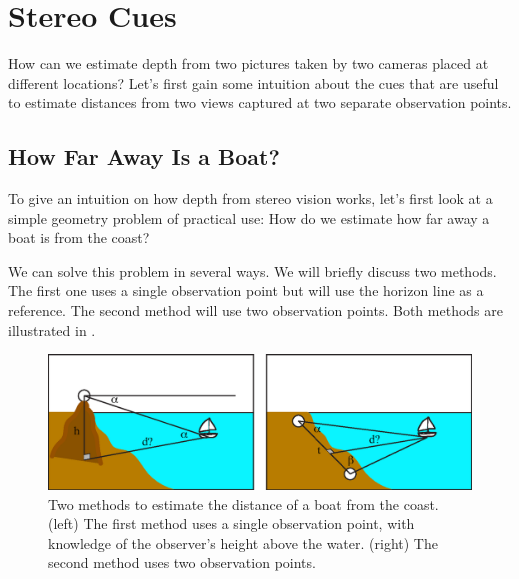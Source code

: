 \section{Stereo Cues}

How can we estimate depth from two pictures taken by two cameras placed at different locations? Let's first gain some intuition about the cues that are useful to estimate distances from two views captured at two separate observation points.

\subsection{How Far Away Is a Boat?}



To give an intuition on how depth from stereo vision works, let's first look at a simple geometry problem of practical use: How do we estimate how far away a boat is from the coast?

We can solve this problem in several ways. We will briefly discuss two methods. The first one uses a single observation point but will use the horizon line as a reference. The second method will use two observation points. Both methods are illustrated in \fig{\ref{fig:2boats}}.


\begin{figure}[t]
\centerline{
\includegraphics[width=1\linewidth]{figures/3d_scene_understanding/boats.eps}
}
\caption{Two methods to estimate the distance of a boat from the coast. (left) The first method uses a single observation point, with knowledge of the observer's height above the water.  (right) The second method uses two observation points.}
\label{fig:2boats}
\end{figure}


